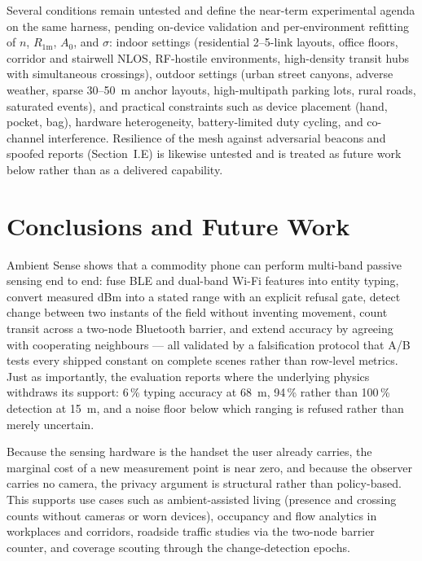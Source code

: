 \documentclass[journal,10pt]{IEEEtran}
\begin{document}
Several conditions remain untested and define the near-term experimental
agenda on the same harness, pending on-device validation and per-environment
refitting of $n$, $R_{1\text{m}}$, $A_0$, and $\sigma$: indoor settings
(residential 2--5-link layouts, office floors, corridor and stairwell NLOS,
RF-hostile environments, high-density transit hubs with simultaneous
crossings), outdoor settings (urban street canyons, adverse weather, sparse
30--50~m anchor layouts, high-multipath parking lots, rural roads, saturated
events), and practical constraints such as device placement (hand, pocket,
bag), hardware heterogeneity, battery-limited duty cycling, and co-channel
interference. Resilience of the mesh against adversarial beacons and spoofed
reports (Section~I.E) is likewise untested and is treated as future work
below rather than as a delivered capability.

\section{Conclusions and Future Work}
Ambient Sense shows that a commodity phone can perform multi-band passive
sensing end to end: fuse BLE and dual-band Wi-Fi features into entity
typing, convert measured dBm into a stated range with an explicit refusal
gate, detect change between two instants of the field without inventing
movement, count transit across a two-node Bluetooth barrier, and extend
accuracy by agreeing with cooperating neighbours --- all validated by a
falsification protocol that A/B tests every shipped constant on complete
scenes rather than row-level metrics. Just as importantly, the evaluation
reports where the underlying physics withdraws its support: 6\,\% typing
accuracy at 68~m, 94\,\% rather than 100\,\% detection at 15~m, and a noise
floor below which ranging is refused rather than merely uncertain.

Because the sensing hardware is the handset the user already carries, the
marginal cost of a new measurement point is near zero, and because the
observer carries no camera, the privacy argument is structural rather than
policy-based. This supports use cases such as ambient-assisted living
(presence and crossing counts without cameras or worn devices), occupancy
and flow analytics in workplaces and corridors, roadside traffic studies via
the two-node barrier counter, and coverage scouting through the
change-detection epochs.
\end{document}
